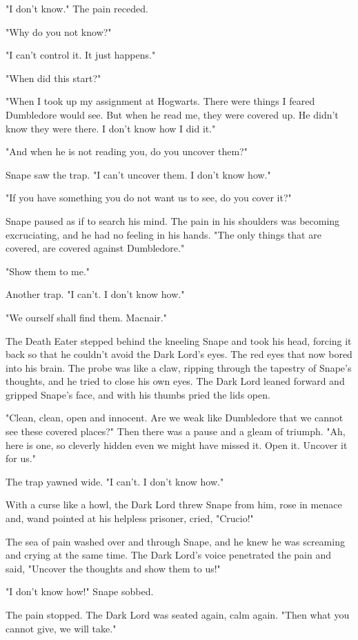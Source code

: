 "I don't know." The pain receded.

"Why do you not know?"

"I can't control it. It just happens."

"When did this start?"

"When I took up my assignment at Hogwarts. There were things I feared Dumbledore would see. But when he read me, they were covered up. He didn't know they were there. I don't know how I did it."

"And when he is not reading you, do you uncover them?"

Snape saw the trap. "I can't uncover them. I don't know how."

"If you have something you do not want us to see, do you cover it?"

Snape paused as if to search his mind. The pain in his shoulders was becoming excruciating, and he had no feeling in his hands. "The only things that are covered, are covered against Dumbledore."

"Show them to me."

Another trap. "I can't. I don't know how."

"We ourself shall find them. Macnair."

The Death Eater stepped behind the kneeling Snape and took his head, forcing it back so that he couldn't avoid the Dark Lord's eyes. The red eyes that now bored into his brain. The probe was like a claw, ripping through the tapestry of Snape's thoughts, and he tried to close his own eyes. The Dark Lord leaned forward and gripped Snape's face, and with his thumbs pried the lids open.

"Clean, clean, open and innocent. Are we weak like Dumbledore that we cannot see these covered places?" Then there was a pause and a gleam of triumph. "Ah, here is one, so cleverly hidden even we might have missed it. Open it. Uncover it for us."

The trap yawned wide. "I can't. I don't know how."

With a curse like a howl, the Dark Lord threw Snape from him, rose in menace and, wand pointed at his helpless prisoner, cried, "Crucio!"

The sea of pain washed over and through Snape, and he knew he was screaming and crying at the same time. The Dark Lord's voice penetrated the pain and said, "Uncover the thoughts and show them to us!"

"I don't know how!" Snape sobbed.

The pain stopped. The Dark Lord was seated again, calm again. "Then what you cannot give, we will take."

